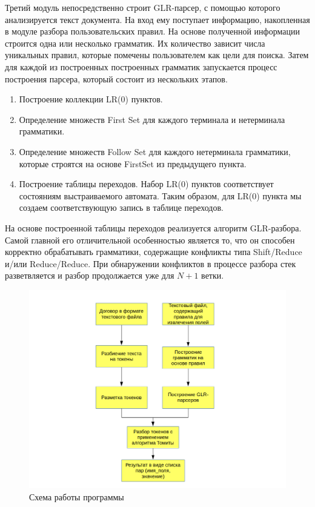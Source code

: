Третий модуль непосредственно строит GLR-парсер, с помощью которого анализируется текст документа. На вход ему поступает информацию, накопленная в модуле разбора пользовательских правил. На основе полученной информации строится одна или несколько грамматик. Их количество зависит числа уникальных правил, которые помечены пользователем как цели для поиска. Затем для каждой из построенных построенных грамматик запускается процесс построения парсера, который состоит из нескольких этапов.
\begin{enumerate}
  \item Построение коллекции LR(0) пунктов.
  \item Определение множеств First Set для каждого терминала и нетерминала грамматики.
  \item Определение множеств Follow Set для каждого нетерминала грамматики, которые строятся на основе FirstSet из предыдущего пункта.
  \item Построение таблицы переходов. Набор LR(0) пунктов соответствует состояниям выстраиваемого автомата. Таким образом, для LR(0) пункта мы создаем соответствующую запись в таблице переходов.
\end{enumerate}
На основе построенной таблицы переходов реализуется алгоритм GLR-разбора. Самой главной его отличительной особенностью является то, что он способен корректно обрабатывать грамматики, содержащие конфликты типа Shift/Reduce и/или Reduce/Reduce. При обнаружении конфликтов в процессе разбора стек разветвляется и разбор продолжается уже для $N+1$ ветки.

\begin{figure}%
\centering
\includegraphics[width=\textwidth]{img/ProjectDiagram.png}
\caption{\label{fig:project-diagram}Схема работы программы}
\label{fig:project-diagram}
\end{figure}

